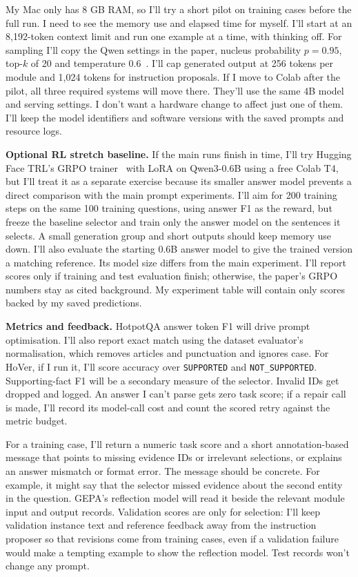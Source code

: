 \documentclass[11pt,a4paper]{article}
\begin{document}
{{{My Mac only has 8 GB RAM, so I'll try a short pilot on training cases before the full run. I need to see the memory use and elapsed time for myself. I'll start at an 8,192-token context limit and run one example at a time, with thinking off. For sampling I'll copy the Qwen settings in the paper, nucleus probability $p=0.95$, top-$k$ of 20 and temperature 0.6~\cite{gepa}. I'll cap generated output at 256 tokens per module and 1,024 tokens for instruction proposals. If I move to Colab after the pilot, all three required systems will move there. They'll use the same 4B model and serving settings. I don't want a hardware change to affect just one of them. I'll keep the model identifiers and software versions with the saved prompts and resource logs.

\textbf{Optional RL stretch baseline.} If the main runs finish in time, I'll try Hugging Face TRL's GRPO trainer~\cite{trl} with LoRA on Qwen3-0.6B using a free Colab T4, but I'll treat it as a separate exercise because its smaller answer model prevents a direct comparison with the main prompt experiments. I'll aim for 200 training steps on the same 100 training questions, using answer F1 as the reward, but freeze the baseline selector and train only the answer model on the sentences it selects. A small generation group and short outputs should keep memory use down. I'll also evaluate the starting 0.6B answer model to give the trained version a matching reference. Its model size differs from the main experiment. I'll report scores only if training and test evaluation finish; otherwise, the paper's GRPO numbers stay as cited background. My experiment table will contain only scores backed by my saved predictions.

\textbf{Metrics and feedback.} HotpotQA answer token F1 will drive prompt optimisation. I'll also report exact match using the dataset evaluator's normalisation, which removes articles and punctuation and ignores case. For HoVer, if I run it, I'll score accuracy over \texttt{SUPPORTED} and \texttt{NOT\_SUPPORTED}. Supporting-fact F1 will be a secondary measure of the selector. Invalid IDs get dropped and logged. An answer I can't parse gets zero task score; if a repair call is made, I'll record its model-call cost and count the scored retry against the metric budget.

For a training case, I'll return a numeric task score and a short annotation-based message that points to missing evidence IDs or irrelevant selections, or explains an answer mismatch or format error. The message should be concrete. For example, it might say that the selector missed evidence about the second entity in the question. GEPA's reflection model will read it beside the relevant module input and output records. Validation scores are only for selection: I'll keep validation instance text and reference feedback away from the instruction proposer so that revisions come from training cases, even if a validation failure would make a tempting example to show the reflection model. Test records won't change any prompt.

}}}
\end{document}
